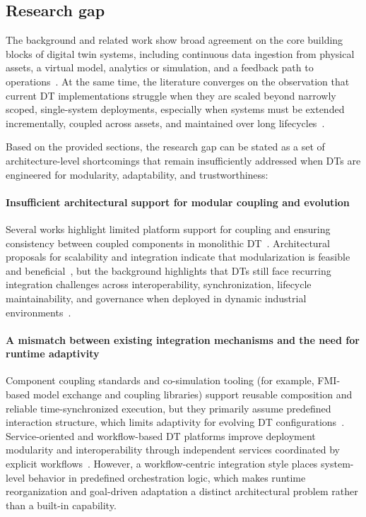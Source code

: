 \subsection{Research gap}
\label{sec:research_gap}

The background and related work show broad agreement on the core building blocks of digital twin  systems, including continuous data ingestion from physical assets, a virtual model, analytics or simulation, and a feedback path to operations~\cite{shao2020framework,jones2020characterising,soori2023digital,inamdar2024_dt_microelectronics}. At the same time, the literature converges on the observation that current DT implementations struggle when they are scaled beyond narrowly scoped, single-system deployments, especially when systems must be extended incrementally, coupled across assets, and maintained over long lifecycles~\cite{Gil2024,Visser2024,Kapteyn2020,vrabic2018digital}.

Based on the provided sections, the research gap can be stated as a set of architecture-level shortcomings that remain insufficiently addressed when DTs are engineered for modularity, adaptability, and trustworthiness:

\paragraph{Insufficient architectural support for modular coupling and evolution}
Several works highlight limited platform support for coupling and ensuring consistency between coupled components in monolithic DT~\cite{Gil2024}. Architectural proposals for scalability and integration indicate that modularization is feasible and beneficial~\cite{Visser2024,Kapteyn2020}, but the background highlights that DTs still face recurring integration challenges across interoperability, synchronization, lifecycle maintainability, and governance when deployed in dynamic industrial environments~\cite{jones2020characterising,kritzinger2018digital,schluse2017experimentable,shao2019cybersecurity}.

\paragraph{A mismatch between existing integration mechanisms and the need for runtime adaptivity}
Component coupling standards and co-simulation tooling (for example, FMI-based model exchange and coupling libraries) support reusable composition and reliable time-synchronized execution, but they primarily assume predefined interaction structure, which limits adaptivity for evolving DT configurations~\cite{blochwitz2012fmi20,muscle3docs}. Service-oriented and workflow-based DT platforms improve deployment modularity and interoperability through independent services coordinated by explicit workflows~\cite{borodulin2017dtcloud,bellavista2024microservices_serverless_dt}. However, a workflow-centric integration style places system-level behavior in predefined orchestration logic, which makes runtime reorganization and goal-driven adaptation a distinct architectural problem rather than a built-in capability.


